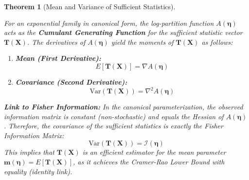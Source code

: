 \documentclass[
  letterpaper,
  DIV=11,
  numbers=noendperiod]{scrreprt}
\providecommand{\tightlist}{%
  \setlength{\itemsep}{0pt}\setlength{\parskip}{0pt}}
\renewcommand{\[}{\begin{equation}}
\renewcommand{\]}{\end{equation}}
\theoremstyle{definition}
\theoremstyle{plain}
\theoremstyle{plain}
\theoremstyle{plain}
\newtheorem{theorem}{Theorem}[chapter]
\theoremstyle{definition}
\theoremstyle{plain}
\theoremstyle{remark}
\begin{document}
\begin{theorem}[Mean and Variance of Sufficient
Statistics]\protect\hypertarget{thm-cumulant-generating}{}\label{thm-cumulant-generating}

For an exponential family in canonical form, the log-partition function
\(A(\boldsymbol{\eta})\) acts as the \textbf{Cumulant Generating
Function} for the sufficient statistic vector
\(\mathbf{T}(\mathbf{X})\). The derivatives of \(A(\boldsymbol{\eta})\)
yield the moments of \(\mathbf{T}(\mathbf{X})\) as follows:

\begin{enumerate}
\def\labelenumi{\arabic{enumi}.}
\tightlist
\item
  \textbf{Mean (First Derivative):} \[
   E[\mathbf{T}(\mathbf{X})] = \nabla A(\boldsymbol{\eta})
   \]
\item
  \textbf{Covariance (Second Derivative):} \[
   \text{Var}(\mathbf{T}(\mathbf{X})) = \nabla^2 A(\boldsymbol{\eta})
   \]
\end{enumerate}

\textbf{Link to Fisher Information:} In the canonical parameterization,
the observed information matrix is constant (non-stochastic) and equals
the Hessian of \(A(\boldsymbol{\eta})\). Therefore, the covariance of
the sufficient statistics is exactly the Fisher Information Matrix: \[
\text{Var}(\mathbf{T}(\mathbf{X})) = \mathcal{I}(\boldsymbol{\eta})
\] This implies that \(\mathbf{T}(\mathbf{X})\) is an efficient
estimator for the mean parameter
\(\mathbf{m}(\boldsymbol{\eta}) = E[\mathbf{T}(\mathbf{X})]\), as it
achieves the Cramer-Rao Lower Bound with equality (identity link).

\end{theorem}
\end{document}
